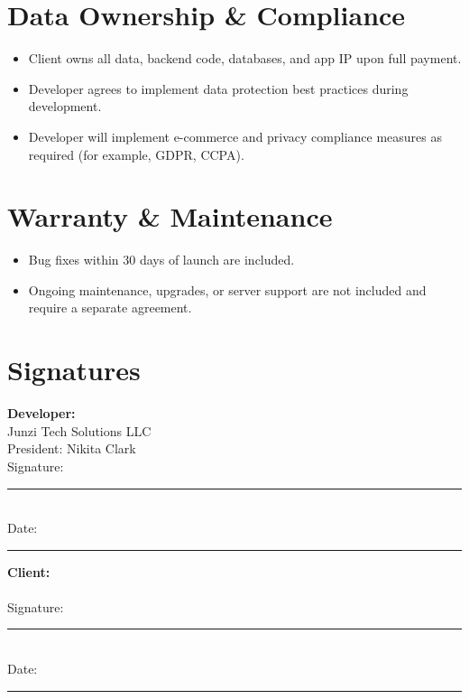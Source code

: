 \documentclass[11pt,letterpaper]{article}
\newcommand{\ClientName}{[CLIENT NAME]}
\begin{document}
\section{Data Ownership \& Compliance}
\begin{itemize}[leftmargin=*]
\item Client owns all data, backend code, databases, and app IP upon full payment.
\item Developer agrees to implement data protection best practices during development.
\item Developer will implement e-commerce and privacy compliance measures as required (for example, GDPR, CCPA).
\end{itemize}

\section{Warranty \& Maintenance}
\begin{itemize}[leftmargin=*]
\item Bug fixes within 30 days of launch are included.
\item Ongoing maintenance, upgrades, or server support are not included and require a separate agreement.
\end{itemize}

\vspace{2em}

\section*{Signatures}

\begin{minipage}{0.45\textwidth}
\textbf{Developer:}\\
Junzi Tech Solutions LLC\\
President: Nikita Clark\\[2em]
Signature: \rule{6cm}{0.4pt}\\[0.5em]
Date: \rule{4cm}{0.4pt}
\end{minipage}
\hfill
\begin{minipage}{0.45\textwidth}
\textbf{Client:}\\
\ClientName{}\\[3em]
Signature: \rule{6cm}{0.4pt}\\[0.5em]
Date: \rule{4cm}{0.4pt}
\end{minipage}
\end{document}
